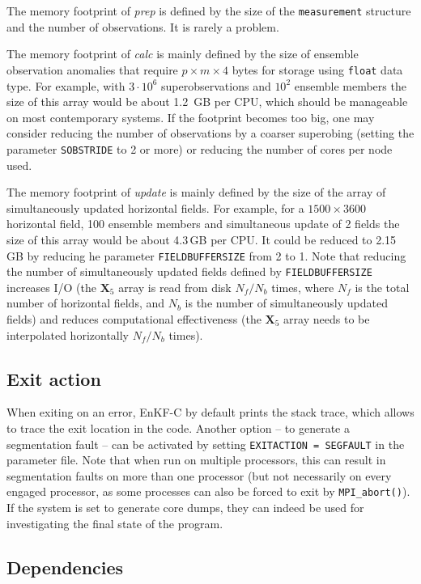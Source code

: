 \documentclass[11pt]{report}
\newcommand{\mb} {\mathbf}
\begin{document}
The memory footprint of \emph{prep} is defined by the size of the \verb|measurement| structure and the number of observations.
It is rarely a problem.

The memory footprint of \emph{calc} is mainly defined by the size of ensemble observation anomalies that require $p \times m \times 4$ bytes for storage using \verb|float| data type.
For example, with $3 \cdot 10^6$ superobservations and $10^2$ ensemble members the size of this array would be about 1.2\, GB per CPU, which should be manageable on most contemporary systems.
If the footprint becomes too big, one may consider reducing the number of observations by a coarser superobing (setting the parameter \verb|SOBSTRIDE| to 2 or more) or reducing the number of cores per node used.

The memory footprint of \emph{update} is mainly defined by the size of the array of simultaneously updated horizontal fields.
For example, for a $1500 \times 3600$ horizontal field, 100 ensemble members and simultaneous update of 2 fields the size of this array would be about 4.3\,GB per CPU.
It could be reduced to 2.15\,GB by reducing he parameter \verb|FIELDBUFFERSIZE| from 2 to 1.
Note that reducing the number of simultaneously updated fields defined by \verb|FIELDBUFFERSIZE| increases I/O (the $\mb X_5$ array is read from disk $N_f / N_b$ times, where $N_f$ is the total number of horizontal fields, and $N_b$ is the number of simultaneously updated fields) and reduces computational effectiveness (the $\mb X_5$ array needs to be interpolated horizontally $N_f / N_b$ times).

\subsection{Exit action}

When exiting on an error, EnKF-C by default prints the stack trace, which allows to trace the exit location in the code.
Another option -- to generate a segmentation fault -- can be activated by setting \verb|EXITACTION = SEGFAULT| in the parameter file.
Note that when run on multiple processors, this can result in segmentation faults on more than one processor (but not necessarily on every engaged processor, as some processes can also be forced to exit by \verb|MPI_abort()|).
If the system is set to generate core dumps, they can indeed be used for investigating the final state of the program.

\subsection{Dependencies}
\end{document}
